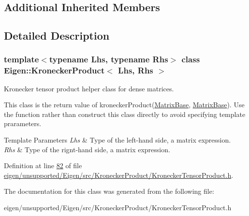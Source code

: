 \subsection*{Additional Inherited Members}


\subsection{Detailed Description}
\subsubsection*{template$<$typename Lhs, typename Rhs$>$\newline
class Eigen\+::\+Kronecker\+Product$<$ Lhs, Rhs $>$}

Kronecker tensor product helper class for dense matrices. 

This class is the return value of kronecker\+Product(\hyperlink{group___core___module_class_eigen_1_1_matrix_base}{Matrix\+Base}, \hyperlink{group___core___module_class_eigen_1_1_matrix_base}{Matrix\+Base}). Use the function rather than construct this class directly to avoid specifying template prarameters.


\begin{DoxyTemplParams}{Template Parameters}
{\em Lhs} & Type of the left-\/hand side, a matrix expression. \\
\hline
{\em Rhs} & Type of the rignt-\/hand side, a matrix expression. \\
\hline
\end{DoxyTemplParams}


Definition at line \hyperlink{eigen_2unsupported_2_eigen_2src_2_kronecker_product_2_kronecker_tensor_product_8h_source_l00082}{82} of file \hyperlink{eigen_2unsupported_2_eigen_2src_2_kronecker_product_2_kronecker_tensor_product_8h_source}{eigen/unsupported/\+Eigen/src/\+Kronecker\+Product/\+Kronecker\+Tensor\+Product.\+h}.



The documentation for this class was generated from the following file\+:\begin{DoxyCompactItemize}
\item 
eigen/unsupported/\+Eigen/src/\+Kronecker\+Product/\+Kronecker\+Tensor\+Product.\+h\end{DoxyCompactItemize}
